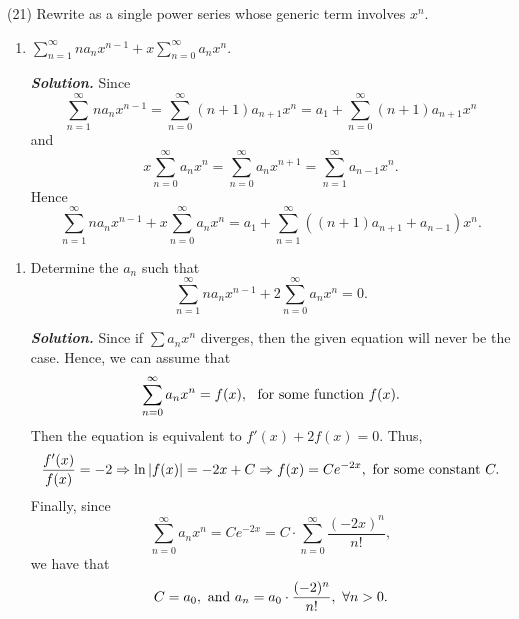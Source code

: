 \documentclass[12pt,a4paper]{article}
\newcommand{\bfit}[1]{%
    \textbf{\textit{#1}}}
\begin{document}
(21) Rewrite as a single power series whose generic term involves $x^n$.
\begin{enumerate}
    \item[21.] $\displaystyle \sum_{n=1}^{\infty}na_nx^{n - 1} + x \sum_{n=0}^{\infty}a_nx^n$. 
    
    \bfit{Solution.} Since
    \[
        \sum_{n = 1}^{\infty} n a_n x^{n - 1} = \sum_{n=0}^{\infty}(n + 1) a_{n + 1}x^n = a_1 +  \sum_{n=0}^{\infty}(n + 1) a_{n + 1}x^n 
    \]
    and 
    \[
        x \sum_{n=0}^{\infty}a_n x^n = \sum_{n=0}^{\infty}a_n x^{n + 1} = \sum_{n = 1}^{\infty}a_{n - 1}x^n.
    \]
    Hence 
    \[
        \sum_{n=1}^{\infty}na_nx^{n - 1} + x \sum_{n=0}^{\infty}a_nx^n = a_1 + \sum_{n = 1}^{\infty} \left((n + 1)a_{n + 1} + a_{n - 1}\right)x^n.
    \]
\end{enumerate}

\begin{enumerate}
    \item[23.] Determine the $a_n$ such that 
    \[
        \sum_{n = 1}^{\infty}n a_n x^{n - 1} + 2\sum_{n=0}^{\infty}a_n x^n = 0.
    \]

    \bfit{Solution.} Since if $\sum a_nx^n$ diverges, then the given equation will never be the case. Hence, we can assume that 
    \[
        \sum_{n=0}^{\infty} a_n x^n = f(x),\ \textup{ for some function } f(x).
    \]
    Then the equation is equivalent to $f'(x) + 2 f(x) = 0.$ Thus, 
    \[
        \dfrac{f'(x)}{f(x)} = - 2 \Rightarrow \ln |f(x)| = - 2x + C \Rightarrow f(x) = Ce^{ - 2x},\textup{\ for some constant }C.
    \]
    Finally, since 
    \[
        \sum_{n=0}^{\infty}a_n x^n =  C e^{ - 2x} = C \cdot \sum_{n=0}^{\infty}\frac{ ( - 2x)^n}{n!},
    \]
    we have that 
    \[
        C = a_0 , \textup{ and }a_n = a_0 \cdot \frac{(-2)^n}{n!},\ \forall n > 0.
    \]
\end{enumerate}
\end{document}
